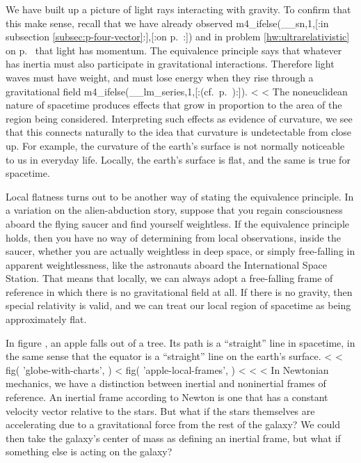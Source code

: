 We have built up a picture of light rays interacting with gravity. To confirm that this make sense, recall that
we have already observed 
m4_ifelse(__sn,1,[:in subsection \ref{subsec:p-four-vector}:],[:on p.~\pageref{fig:maxwellian-momentum-of-light}:])
and in problem \ref{hw:ultrarelativistic} on p.~\pageref{hw:ultrarelativistic}
that light has momentum.
The equivalence principle says that whatever has inertia must also participate in gravitational interactions.
Therefore light waves must have weight, and must lose energy when they rise through a gravitational 
field%
m4_ifelse(__lm_series,1,[:(cf.~p.~\pageref{light-wave-energy-doppler}):]).
<%
<%
The noneuclidean nature of spacetime produces effects
that grow in proportion to the area of the region being considered. Interpreting such effects as evidence of curvature,
we see that this connects naturally to the idea that curvature is undetectable from close up. For example, the curvature
of the earth's surface is not normally noticeable to us in everyday life. Locally, the earth's surface is flat,
and the same is true for spacetime. 

Local flatness turns out to be another way of stating the equivalence
principle. In a variation on the alien-abduction story, suppose that you regain consciousness aboard the flying saucer and
find yourself weightless. If the equivalence principle holds, then you have no way of determining from local observations,
inside the saucer, whether you are actually weightless in deep space, or simply free-falling in apparent weightlessness,
like the astronauts aboard the International Space Station. That means that locally, we can always adopt a free-falling
frame of reference in which there is no gravitational field at all. If there is no gravity, then special relativity is valid,
and we can treat our local region of spacetime as being approximately flat.

In figure , an apple falls out of a tree. Its path is a ``straight'' line in spacetime, in the same sense
that the equator is a ``straight'' line on the earth's surface.
<%
<%
  fig(
    'globe-with-charts',
  )
\spacebetweenfigs
<%
  fig(
    'apple-local-frames',
  )
<%
<%
<%
In Newtonian mechanics, we have a distinction between inertial and noninertial frames of reference.
An inertial frame according to Newton is one that has a constant velocity vector relative to the stars. But what if the stars themselves
are accelerating due to a gravitational force from the rest of the galaxy? We could then take the galaxy's center of mass as defining
an inertial frame, but what if something else is acting on the galaxy?

